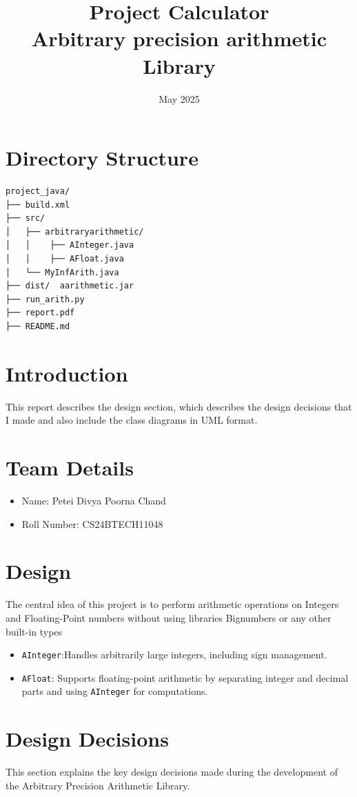 \documentclass{article}
\title{Project Calculator\\
\large Arbitrary precision arithmetic Library}
\date{May 2025}
\begin{document}
\maketitle
\section*{Directory Structure}
\begin{verbatim}
project_java/
├── build.xml
├── src/
│   ├── arbitraryarithmetic/
│   │    ├── AInteger.java
│   │    ├── AFloat.java
│   └── MyInfArith.java
├── dist/  aarithmetic.jar
├── run_arith.py
├── report.pdf
├── README.md
\end{verbatim}

\section*{Introduction}
This report describes the design section, which describes the design decisions that I made and also include the class diagrams in UML format.


\section*{Team Details}
\begin{itemize}
  \item Name: Petei Divya Poorna Chand
  \item Roll Number: CS24BTECH11048
\end{itemize}

\section*{Design}
The central idea of this project is to perform arithmetic operations on Integers and Floating-Point numbers without using libraries Bignumbers or any other built-in types
\begin{itemize}
    \item \texttt{AInteger}:Handles arbitrarily large integers, including sign management.
    \item \texttt{AFloat}:  Supports floating-point arithmetic by separating integer and decimal parts and using \texttt{AInteger} for computations.
\end{itemize}
\section*{Design Decisions}

This section explains the key design decisions made during the development of the Arbitrary Precision Arithmetic Library.
\end{document}
